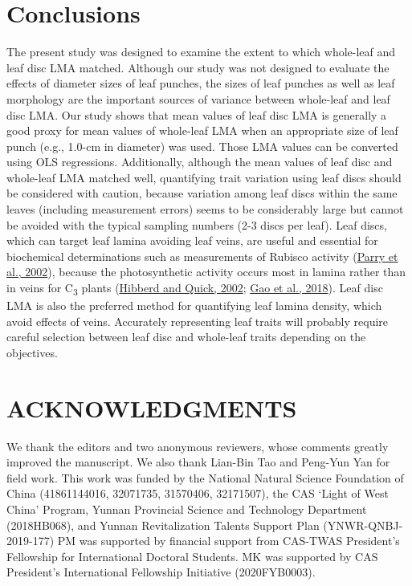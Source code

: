 \documentclass[
  12pt,
  a4paper,
,tablecaptionabove
]{scrartcl}
\begin{document}
\hypertarget{conclusions}{%
\section{Conclusions}\label{conclusions}}

The present study was designed to examine the extent to which whole-leaf and leaf disc LMA matched.
Although our study was not designed to evaluate the effects of diameter sizes of leaf punches, the sizes of leaf punches as well as leaf morphology are the important sources of variance between whole-leaf and leaf disc LMA.
Our study shows that mean values of leaf disc LMA is generally a good proxy for mean values of whole-leaf LMA when an appropriate size of leaf punch (e.g., 1.0-cm in diameter) was used.
Those LMA values can be converted using OLS regressions.
Additionally, although the mean values of leaf disc and whole-leaf LMA matched well, quantifying trait variation using leaf discs should be considered with caution, because variation among leaf discs within the same leaves (including measurement errors) seems to be considerably large but cannot be avoided with the typical sampling numbers (2-3 discs per leaf).
Leaf discs, which can target leaf lamina avoiding leaf veins, are useful and essential for biochemical determinations such as measurements of Rubisco activity (\protect\hyperlink{ref-Parry2002}{Parry et al., 2002}), because the photosynthetic activity occurs most in lamina rather than in veins for C\textsubscript{3} plants (\protect\hyperlink{ref-Hibberd2002}{Hibberd and Quick, 2002}; \protect\hyperlink{ref-Gao2018}{Gao et al., 2018}).
Leaf disc LMA is also the preferred method for quantifying leaf lamina density, which avoid effects of veins.
Accurately representing leaf traits will probably require careful selection between leaf disc and whole-leaf traits depending on the objectives.

\hypertarget{acknowledgments}{%
\section{ACKNOWLEDGMENTS}\label{acknowledgments}}

We thank the editors and two anonymous reviewers, whose comments greatly improved the manuscript.
We also thank Lian-Bin Tao and Peng-Yun Yan for field work.
This work was funded by the National Natural Science Foundation of China (41861144016, 32071735, 31570406, 32171507), the CAS `Light of West China' Program, Yunnan Provincial Science and Technology Department (2018HB068), and Yunnan Revitalization Talents Support Plan (YNWR-QNBJ-2019-177)
PM was supported by financial support from CAS-TWAS President's Fellowship for International Doctoral Students.
MK was supported by CAS President's International Fellowship Initiative (2020FYB0003).
\end{document}
